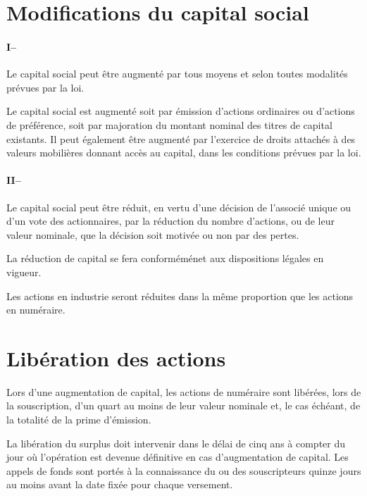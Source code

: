 \documentclass[a4paper,12pt]{report}
\begin{document}
\section{Modifications du capital social}
\paragraph{I\hspace{4mm}--}Le capital social peut être augmenté par tous moyens et selon toutes modalités prévues par la loi.

Le capital social est augmenté soit par émission d'actions ordinaires ou d'actions de préférence, soit par majoration du montant nominal des titres de capital existants. 
Il peut également être augmenté par l'exercice de droits attachés à des valeurs mobilières donnant accès au capital, dans les conditions prévues par la loi.

\paragraph{II\hspace{4mm}--}Le capital social peut être réduit, en vertu d'une décision de l'associé unique ou d'un vote des actionnaires, par la réduction du nombre d'actions, ou de leur valeur nominale, que la décision soit motivée ou non par des pertes.

La réduction de capital se fera conforméménet aux dispositions légales en vigueur.

Les actions en industrie seront réduites dans la même proportion que les actions en numéraire.


\section{Libération des actions}
Lors d'une augmentation de capital, les actions de numéraire sont libérées, lors de la souscription, 
d'un quart au moins de leur valeur nominale et, le cas échéant, de la totalité de la prime d'émission.

La libération du surplus doit intervenir dans le délai de cinq ans à compter du jour où l'opération est devenue définitive en cas d'augmentation de capital. 
Les appels de fonds sont portés à la connaissance du ou des souscripteurs quinze jours au moins avant la date fixée pour chaque versement.
\end{document}
